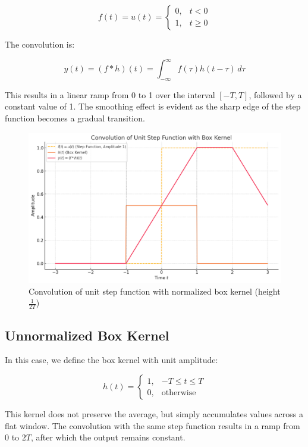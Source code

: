 \documentclass{article}
\begin{document}
\[
f(t) = u(t) =
\begin{cases}
0, & t < 0 \\
1, & t \geq 0
\end{cases}
\]

The convolution is:

\[
y(t) = (f * h)(t) = \int_{-\infty}^{\infty} f(\tau) h(t - \tau) \, d\tau
\]

This results in a linear ramp from 0 to 1 over the interval \([-T, T]\), followed by a constant value of 1. The smoothing effect is evident as the sharp edge of the step function becomes a gradual transition.

\begin{figure}[H]
    \centering
    \includegraphics[width=0.9\linewidth]{figs/normalized.png}
\caption{Convolution of unit step function with normalized box kernel (height \(\frac{1}{2T}\))}
\end{figure}

\subsection{Unnormalized Box Kernel}

In this case, we define the box kernel with unit amplitude:

\[
h(t) =
\begin{cases}
1, & -T \le t \le T \\
0, & \text{otherwise}
\end{cases}
\]

This kernel does not preserve the average, but simply accumulates values across a flat window. The convolution with the same step function results in a ramp from 0 to \(2T\), after which the output remains constant.
\end{document}
